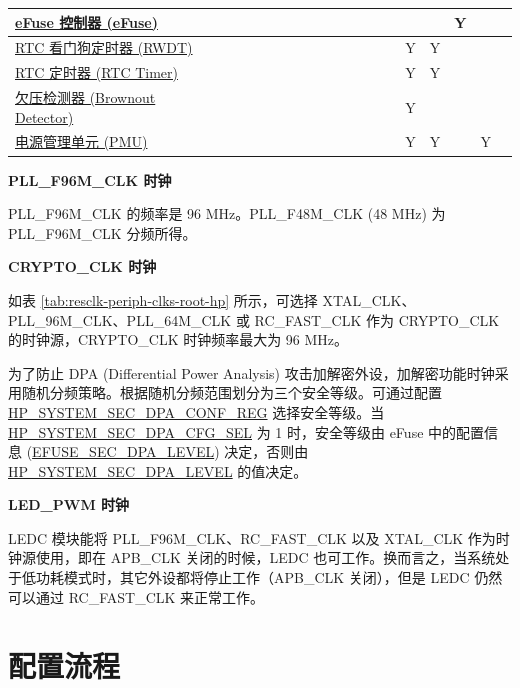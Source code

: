 \documentclass[main\_\_CN.tex]{subfiles}
\begin{document}
\begin{landscape}
\begin{tiny}
\begin{longtable}[c]{|m{2.1cm}|c|c|c|c|c|c|c|c|c|C{1.4cm}|c|c|c|c|c|c|c|c|c| }
    \hyperref[mod:efuse]{eFuse 控制器 (eFuse)} &  &  &  &  &  &  &  &  &  &  &  &  &  &  &  &  & Y &  &  \\ \hline
    \hyperref[mod:wdt]{RTC 看门狗定时器 (RWDT)}  &  &  &  &  &  &  &  &  &  &  &  &  &  &  & Y & Y &  &  &  \\ \hline
    \hyperref[mod:lowpowm]{RTC 定时器 (RTC Timer)}  &  &  &  &  &  &  &  &  &  &  &  &  &  &  & Y & Y &  &  &  \\ \hline
    \hyperref[mod:lowpowm]{欠压检测器 (Brownout Detector)} &  &  &  &  &  &  &  &  &  &  &  &  &  &  & Y &  &  &  &  \\ \hline
    \hyperref[mod:lowpowm]{电源管理单元 (PMU)} &  &  &  &  &  &  &  &  &  &  &  &  &  &  & Y & Y &  & Y &  \\ \hline
\end{longtable}
\end{tiny}

\end{landscape}


\textbf{PLL\_F96M\_CLK 时钟}

PLL\_F96M\_CLK 的频率是 96 MHz。PLL\_F48M\_CLK (48 MHz) 为 PLL\_F96M\_CLK 分频所得。

\textbf{CRYPTO\_CLK 时钟}

如表 \ref{tab:resclk-periph-clks-root-hp} 所示，可选择 XTAL\_CLK、PLL\_96M\_CLK、PLL\_64M\_CLK 或 RC\_FAST\_CLK 作为 CRYPTO\_CLK 的时钟源，CRYPTO\_CLK 时钟频率最大为 96 MHz。


为了防止 DPA (Differential Power Analysis) 攻击加解密外设，加解密功能时钟采用随机分频策略。根据随机分频范围划分为三个安全等级。可通过配置 \hyperref[regdesc:HPSYSTEMSECDPACONFREG]{HP\_SYSTEM\_SEC\_DPA\_CONF\_REG} 选择安全等级。当 \hyperref[fielddesc:HPSYSTEMSECDPACFGSEL]{HP\_SYSTEM\_SEC\_DPA\_CFG\_SEL} 为 1 时，安全等级由 eFuse 中的配置信息 (\hyperref[fielddesc:EFUSESECDPALEVEL]{EFUSE\_SEC\_DPA\_LEVEL}) 决定，否则由 \hyperref[fielddesc:HPSYSTEMSECDPALEVEL]{HP\_SYSTEM\_SEC\_DPA\_LEVEL} 的值决定。

\textbf{LED\_PWM 时钟}


LEDC 模块能将 PLL\_F96M\_CLK、RC\_FAST\_CLK 以及 XTAL\_CLK 作为时钟源使用，即在 APB\_CLK 关闭的时候，LEDC 也可工作。换而言之，当系统处于低功耗模式时，其它外设都将停止工作（APB\_CLK 关闭），但是 LEDC 仍然可以通过 RC\_FAST\_CLK 来正常工作。






\section{配置流程}
\label{sec:resclk-prog-procedures}
\end{document}
